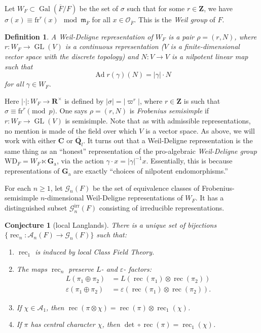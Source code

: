 \documentclass{article}
\DeclareMathOperator{\adjoint}{Ad}
\DeclareMathOperator{\galois}{Gal}
\DeclareMathOperator{\GL}{GL}
\DeclareMathOperator{\reciprocity}{rec}
\newcommand{\frob}{\mathrm{fr}} %
\newcommand{\Ga}{\mathbf{G}_\mathrm{a}}
\newcommand{\WD}{\mathrm{WD}} %
\newcommand{\cA}{\mathcal{A}}
\newcommand{\cG}{\mathcal{G}}
\newcommand{\cO}{\mathcal{O}}
\newcommand{\dC}{\mathbf{C}}
\newcommand{\dQ}{\mathbf{Q}}
\newcommand{\dR}{\mathbf{R}}
\newcommand{\dZ}{\mathbf{Z}}
\newcommand{\fm}{\mathfrak{m}}
\newtheorem{conjecture}[subsection]{Conjecture}
\newtheorem{definition}[subsection]{Definition}
\begin{document}
Let $W_F\subset\galois(\overline F/F)$ be the set of $\sigma$ such that 
for some $r\in \dZ$, we have $\sigma(x)\equiv \frob^r(x)\mod \fm_{\overline F}$ 
for all $x\in \cO_{\overline F}$. This is the \emph{Weil group} of $F$. 

\begin{definition}
A \emph{Weil-Deligne representation} of $W_F$ is a pair $\rho=(r,N)$, where 
$r:W_F\to \GL(V)$ is a continuous representation ($V$ is a finite-dimensional 
vector space with the discrete topology) and $N:V\to V$ is a nilpotent linear 
map such that 
\[
  \adjoint r(\gamma)(N) = |\gamma|\cdot N 
\]
for all $\gamma\in W_F$. 
\end{definition}

Here $|\cdot|:W_F\to \dR^\times$ is defined by $|\sigma|=|\varpi^r|$, where 
$r\in \dZ$ is such that $\sigma\equiv \frob^r\pmod p$. One says 
$\rho=(r,N)$ is \emph{Frobenius semisimple} if $r:W_F\to \GL(V)$ is semisimple. 
Note that as with admissible representations, no mention is made of the field 
over which $V$ is a vector space. As above, we will work with either $\dC$ or 
$\overline{\dQ_l}$. It turns out that a Weil-Deligne representation is the same 
thing as an ``honest'' representation of the pro-algebraic \emph{Weil-Deligne 
group} $\WD_F=W_F\ltimes \Ga$, via the action 
$\gamma\cdot x = |\gamma|^{-1} x$. Essentially, this is because representations 
of $\Ga$ are exactly ``choices of nilpotent endomorphisms.'' 

For each $n\geqslant 1$, let $\cG_n(F)$ be the set of equivalence classes of 
Frobenius-semisimple $n$-dimensional Weil-Deligne representations of $W_F$. It 
has a distinguished subset $\cG_n^\mathrm{irr}(F)$ consisting of irreducible 
representations. 

\begin{conjecture}[local Langlands]\label{conj:local-langlands}
There is a unique set of bijections $\{\reciprocity_n:\cA_n(F)\to \cG_n(F)\}$ 
such that: 
\begin{enumerate}
\item $\reciprocity_1$ is induced by local Class Field Theory. 

\item The maps $\reciprocity_n$ preserve $L$- and $\varepsilon$- factors: 
\begin{align*}
  L(\pi_1\oplus \pi_2) 
    &= L(\reciprocity(\pi_1)\otimes \reciprocity(\pi_2)) \\
  \varepsilon(\pi_1\oplus \pi_2) 
    &= \varepsilon(\reciprocity(\pi_1)\otimes \reciprocity(\pi_2)) .
\end{align*}

\item If $\chi\in \cA_1$, then 
$\reciprocity(\pi\otimes \chi)=\reciprocity(\pi)\otimes \reciprocity_1(\chi)$. 

\item If $\pi$ has central character $\chi$, then 
$\det\circ \reciprocity(\pi) = \reciprocity_1(\chi)$. 
\end{enumerate}
\end{conjecture}
\end{document}
